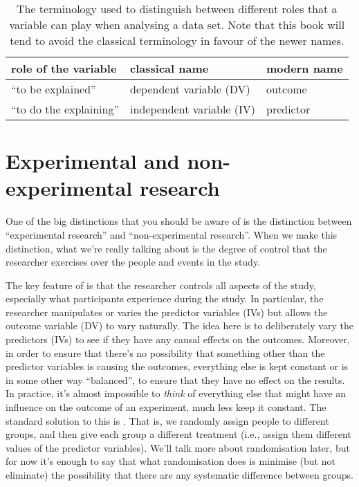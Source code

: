 \begin{table}
\caption{The terminology used to distinguish between different roles that a variable can play when analysing a data set. Note that this book will tend to avoid the classical terminology in favour of the newer names.} \label{tab:ivdv} \tabcapsep
\begin{center}
\begin{tabular}{l|ll}
role of the variable & classical name & modern name  \\ \hline
``to be explained'' & dependent variable (DV) & outcome \\
``to do the explaining'' & independent variable (IV) & predictor \\ 
\end{tabular} 
\tabcapsep \HR
\end{center}
\end{table}


\section{Experimental and non-experimental research~\label{sec:researchdesigns}}

One of the big distinctions that you should be aware of is the distinction between ``experimental research'' and ``non-experimental research''. When we make this distinction, what we're really talking about is the degree of control that the researcher exercises over the people and events in the study.


The key feature of  is that the researcher controls all aspects of the study, especially what participants experience during the study. In particular, the researcher manipulates or varies the predictor variables (IVs) but allows the outcome variable (DV) to vary naturally. The idea here is to deliberately vary the predictors (IVs) to see if they have any causal effects on the outcomes. Moreover, in order to ensure that there's no possibility that something other than the predictor variables is causing the outcomes, everything else is kept constant or is in some other way ``balanced'', to ensure that they have no effect on the results. In practice, it's almost impossible to {\it think} of everything else that might have an influence on the outcome of an experiment, much less keep it constant. The standard solution to this is . That is, we randomly assign people to different groups, and then give each group a different treatment (i.e., assign them different values of the predictor variables). We'll talk more about randomisation later, but for now it's enough to say that what randomisation does is minimise (but not eliminate) the possibility that there are any systematic difference between groups. 

